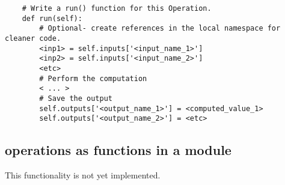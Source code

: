 \begin{lstlisting}
    # Write a run() function for this Operation.
    def run(self):
        # Optional- create references in the local namespace for cleaner code.
        <inp1> = self.inputs['<input_name_1>']
        <inp2> = self.inputs['<input_name_2>']
        <etc>
        # Perform the computation
        < ... >
        # Save the output
        self.outputs['<output_name_1>'] = <computed_value_1>
        self.outputs['<output_name_2>'] = <etc>
\end{lstlisting}


\subsection{operations as functions in a module}
\label{sec:op_dev_by_function}

This functionality is not yet implemented.

